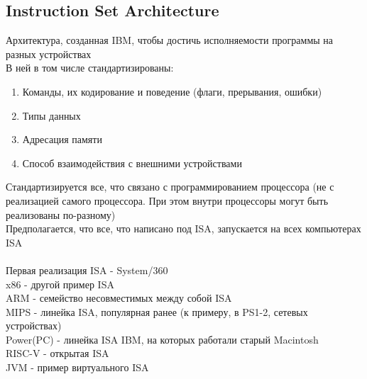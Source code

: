 \documentclass[12pt]{article}
\begin{document}
\subsection{Instruction Set Architecture}
Архитектура, созданная IBM, чтобы достичь исполняемости программы на разных устройствах\\
В ней в том числе стандартизированы:
\begin{enumerate}
    \item Команды, их кодирование и поведение (флаги, прерывания, ошибки)
    \item Типы данных
    \item Адресация памяти
    \item Способ взаимодействия с внешними устройствами
\end{enumerate}
Стандартизируется все, что связано с программированием процессора (не с реализацией самого процессора. При этом внутри процессоры могут быть реализованы по-разному)\\
Предполагается, что все, что написано под ISA, запускается на всех компьютерах ISA\\\\
Первая реализация ISA - System/360\\
x86 - другой пример ISA\\
ARM - семейство несовместимых между собой ISA\\
MIPS - линейка ISA, популярная ранее (к примеру, в PS1-2, сетевых устройствах)\\
Power(PC) - линейка ISA IBM, на которых работали старый Macintosh\\
RISC-V - открытая ISA\\
JVM - пример виртуального ISA
\end{document}
